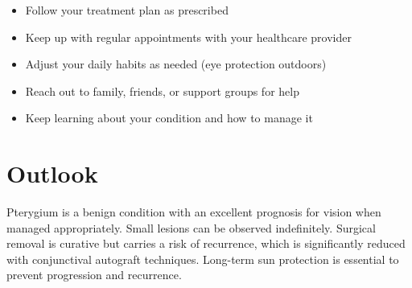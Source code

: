 \begin{itemize}[noitemsep]
  \item Follow your treatment plan as prescribed
  \item Keep up with regular appointments with your healthcare provider
  \item Adjust your daily habits as needed (eye protection outdoors)
  \item Reach out to family, friends, or support groups for help
  \item Keep learning about your condition and how to manage it
\end{itemize}

\section{Outlook}
Pterygium is a benign condition with an excellent prognosis for vision when managed appropriately. Small lesions can be observed indefinitely. Surgical removal is curative but carries a risk of recurrence, which is significantly reduced with conjunctival autograft techniques. Long-term sun protection is essential to prevent progression and recurrence.
